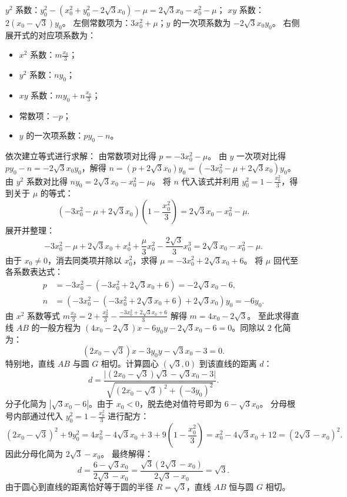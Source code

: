 \begin{solution}
$y^2$ 系数：$y_0^2 - (x_0^2 + y_0^2 - 2\sqrt{3}x_0) - \mu = 2\sqrt{3}x_0 - x_0^2 - \mu$；
$xy$ 系数：$2(x_0 - \sqrt{3})y_0$。
左侧常数项为：$3x_0^2 + \mu$；$y$ 的一次项系数为 $-2\sqrt{3}x_0 y_0$。
右侧展开式的对应项系数为：
\begin{itemize}
\item $x^2$ 系数：$m \frac{x_0}{3}$；
\item $y^2$ 系数：$n y_0$；
\item $xy$ 系数：$m y_0 + n \frac{x_0}{3}$；
\item 常数项：$-p$；
\item $y$ 的一次项系数：$p y_0 - n$。
\end{itemize}
依次建立等式进行求解：
由常数项对比得 $p = -3x_0^2 - \mu$。
由 $y$ 一次项对比得 $p y_0 - n = -2\sqrt{3}x_0 y_0$，解得 $n = (p + 2\sqrt{3}x_0)y_0 = (-3x_0^2 - \mu + 2\sqrt{3}x_0)y_0$。
由 $y^2$ 系数对比得 $n y_0 = 2\sqrt{3}x_0 - x_0^2 - \mu$。
将 $n$ 代入该式并利用 $y_0^2 = 1 - \frac{x_0^2}{3}$，得到关于 $\mu$ 的等式：
\[ (-3x_0^2 - \mu + 2\sqrt{3}x_0)\left(1 - \frac{x_0^2}{3}\right) = 2\sqrt{3}x_0 - x_0^2 - \mu. \]
展开并整理：
\[ -3x_0^2 - \mu + 2\sqrt{3}x_0 + x_0^4 + \frac{\mu}{3}x_0^2 - \frac{2\sqrt{3}}{3}x_0^3 = 2\sqrt{3}x_0 - x_0^2 - \mu. \]
由于 $x_0 \neq 0$，消去同类项并除以 $x_0^2$，求得 $\mu = -3x_0^2 + 2\sqrt{3}x_0 + 6$。
将 $\mu$ 回代至各系数表达式：
\begin{align*}
p &= -3x_0^2 - (-3x_0^2 + 2\sqrt{3}x_0 + 6) = -2\sqrt{3}x_0 - 6, \\
n &= (-3x_0^2 - (-3x_0^2 + 2\sqrt{3}x_0 + 6) + 2\sqrt{3}x_0)y_0 = -6y_0.
\end{align*}
由 $x^2$ 系数等式 $m \frac{x_0}{3} = 2 + \frac{x_0^2}{3} - \frac{-3x_0^2 + 2\sqrt{3}x_0 + 6}{3}$ 解得 $m = 4x_0 - 2\sqrt{3}$。
至此求得直线 $AB$ 的一般方程为 $(4x_0 - 2\sqrt{3})x - 6y_0 y - 2\sqrt{3}x_0 - 6 = 0$。同除以 $2$ 化简为：
\[ (2x_0 - \sqrt{3})x - 3y_0 y - \sqrt{3}x_0 - 3 = 0. \]
特别地，直线 $AB$ 与圆 $G$ 相切。计算圆心 $(\sqrt{3}, 0)$ 到该直线的距离 $d$：
\[ d = \frac{\big|(2x_0 - \sqrt{3})\sqrt{3} - \sqrt{3}x_0 - 3\big|}{\sqrt{(2x_0 - \sqrt{3})^2 + (-3y_0)^2}}. \]
分子化简为 $|\sqrt{3}x_0 - 6|$。由于 $x_0 < 0$，脱去绝对值符号即为 $6 - \sqrt{3}x_0$。
分母根号内部通过代入 $y_0^2 = 1 - \frac{x_0^2}{3}$ 进行配方：
\[ (2x_0 - \sqrt{3})^2 + 9y_0^2 = 4x_0^2 - 4\sqrt{3}x_0 + 3 + 9\left(1 - \frac{x_0^2}{3}\right) = x_0^2 - 4\sqrt{3}x_0 + 12 = (2\sqrt{3} - x_0)^2. \]
因此分母化简为 $2\sqrt{3} - x_0$。
最终解得：
\[ d = \frac{6 - \sqrt{3}x_0}{2\sqrt{3} - x_0} = \frac{\sqrt{3}(2\sqrt{3} - x_0)}{2\sqrt{3} - x_0} = \sqrt{3}. \]
由于圆心到直线的距离恰好等于圆的半径 $R = \sqrt{3}$，直线 $AB$ 恒与圆 $G$ 相切。
\end{solution}

